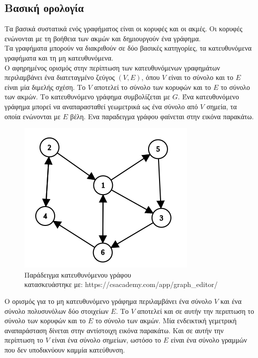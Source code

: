 \documentclass[oneside,12pt]{book}
\newenvironment{matlab}
	{\begin{figure}[hp]\centering\captionsetup{justification=centering}}
	{\end{figure}}
\theoremstyle{definition}
\begin{document}
\subsection{Βασική ορολογία}

Τα βασικά συστατικά ενός γραφήματος είναι  οι κορυφές και οι ακμές. Οι κορυφές ενώνονται με τη βοήθεια των ακμών και δημιουργούν ένα γράφημα. \\

Τα γραφήματα μπορούν να διακριθούν σε δύο βασικές κατηγορίες, τα κατευθυνόμενα γραφήματα και τη μη κατευθυνόμενα. \\

Ο αφηρημένος ορισμός στην περίπτωση των κατευθυνόμενων γραφημάτων περιλαμβάνει ένα διατεταγμένο ζεύγος \((V,E)\), όπου \(V\) είναι το σύνολο και το \(E\) είναι μία διμελής σχέση. Το \(V\) αποτελεί το σύνολο των κορυφών και το \(E\) το σύνολο των ακμών. Το κατευθυνόμενο γράφημα συμβολίζεται με \(G\). Ένα κατευθυνόμενο γράφημα μπορεί να αναπαρασταθεί γεωμετρικά ως ένα σύνολο από \(V\) σημεία, τα οποία ενώνονται με \(E\) βέλη. Ενα παραδειγμα γράφου φαίνεται στην εικόνα παρακάτω.

\begin{matlab}
	\includegraphics[scale=0.8]{images/directed_graph_example.png}
	\caption{Παράδειγμα κατευθυνόμενου γράφου \\ κατασκευάστηκε με: https://csacademy.com/app/graph\_editor/}
\end{matlab}

Ο ορισμός για το μη κατευθυνόμενο γράφημα περιλαμβάνει ένα σύνολο \(V\) και ένα σύνολο πολυσυνόλων δύο στοιχείων \(E\). Το \(V\) αποτελεί και σε αυτήν την περιπτωση το σύνολο των κορυφών και το \(E\) το σύνολο των ακμών. Μία ενδεικτική γεμετρική αναπαράσταση δίνεται στην αντίστοιχη εικόνα παρακάτω. Και σε αυτήν την περίπτωση το \(V\) είναι ένα σύνολο σημείων, ωστόσο το \(E\) είναι ένα σύνολο γραμμών που δεν υποδικνύουν καμμία κατεύθυνση. \\
\end{document}
